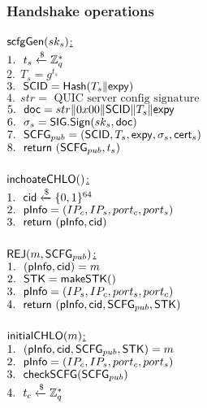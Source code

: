 

\subsubsection{Handshake operations}
\noindent
\underline{$\mathsf{scfgGen}(sk_s)$:} \\
 $1.\ \ t_s \xleftarrow{\$} \mathbb{Z}_{q}^{\ast}$ \\
 $2.\ \ T_s = g^{t_s}$ \\
 $3.\ \ \mathsf{SCID} = \mathsf{Hash}(T_s \| \mathsf{expy})$ \\
 $4.\ \ str = \text{ QUIC server config signature }$ \\
 $5.\ \ \mathsf{doc} = str \| 0x00 \| \mathsf{SCID} \| T_s \| \mathsf{expy}$ \\
 $6.\ \ \sigma_s = \mathsf{SIG}.\mathsf{Sign}(sk_s, \mathsf{doc})$ \\
 $7.\ \ \mathsf{SCFG}_{pub} = (\mathsf{SCID}, T_s, \mathsf{expy}, \sigma_s, \mathsf{cert}_s)$ \\
 $8.\ \ \mathsf{return}\ (\mathsf{SCFG}_{pub}, t_s)$ \\
\\
\underline{$\mathsf{inchoateCHLO}()$:} \\
 $1.\ \ \mathsf{cid} \xleftarrow{\$} \{0,1\}^{64} $ \\
 $2.\ \ \mathsf{pInfo} = (IP_c, IP_s, port_c, port_s)$ \\
 $3.\ \ \mathsf{return}\ (\mathsf{pInfo}, \mathsf{cid})$ \\
\\
\underline{$\mathsf{REJ}(m, \mathsf{SCFG}_{pub})$:} \\
 $1.\ \ (\mathsf{pInfo}, \mathsf{cid}) = m$ \\
 $2.\ \ \mathsf{STK} = \mathsf{makeSTK}()$ \\
 $3.\ \ \mathsf{pInfo} = (IP_s, IP_c, port_s, port_c)$ \\
 $4.\ \ \mathsf{return}\ (\mathsf{pInfo}, \mathsf{cid}, \mathsf{SCFG}_{pub}, \mathsf{STK})$ \\
\\
\underline{$\mathsf{initialCHLO}(m)$:} \\
 $1.\ \ (\mathsf{pInfo}, \mathsf{cid}, \mathsf{SCFG}_{pub}, \mathsf{STK}) = m$ \\
 $2.\ \ \mathsf{pInfo} = (IP_c, IP_s, port_c, port_s)$ \\
 $3.\ \ \mathsf{checkSCFG}(\mathsf{SCFG}_{pub})$ \\
 $4.\ \ t_c \xleftarrow{\$} \mathbb{Z}_{q}^{\ast}$ \\
